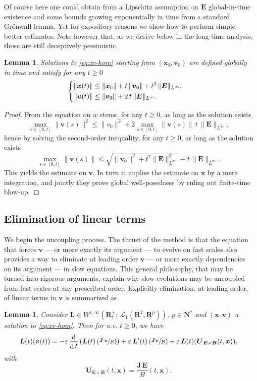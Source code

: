 \documentclass[JEP,XML,SOM,Unicode]{cedram}
\let\mathcal\mathscr
\newenvironment{splitcases}
{\begin{cases}\begin{aligned}}
{\end{aligned}\end{cases}}
\let\eps\varepsilon
\DeclareMathOperator\dD{d}\let\dd\dD
\theoremstyle{plain}
\newtheorem{lemma}[theorem]{Lemma}
\theoremstyle{definition}
\newcommand{\be}{\begin{equation}}
\newcommand{\ee}{\end{equation}}
\newcommand{\bl}{\begin{lemma}}
\newcommand{\el}{\end{lemma}}
\newcommand\R{\mathbf R}
\newcommand{\N}{\mathbf N}
\newcommand\bB{{\boldsymbol B}}
\newcommand\bE{{\boldsymbol E}}
\newcommand\bJ{{\boldsymbol J}}
\newcommand\bL{{\boldsymbol L}}
\newcommand\bU{{\boldsymbol U}}
\newcommand\bfv{{\boldsymbol v}}
\newcommand\bfx{{\boldsymbol x}}
\newcommand\cL{{\mathcal L}}
\let\e w
\newcommand{\EcB}{\bU_{\bE\times\bB}}
\begin{document}
Of course here one could obtain from a Lipschitz assumption on $\bE$ global-in-time existence and some bounds growing exponentially in time from a standard Grönwall lemma. Yet for expository reasons we show how to perform simple better estimates. Note however that, as we derive below in the long-time analysis, those are still deceptively pessimistic.

\bl
\label{toy-bnd0}
Solutions to \eqref{eq:xv-hom} starting from $(\bfx_0,\bfv_0)$ are
defined globally in time and satisfy for any $t\geq0$
\[
\begin{splitcases}
\|\bfx(t)\|&\leq \|\bfx_0\|
+t\,\|\bfv_0\|+t^2\,\|\bE\|_{L^\infty},
\\
\|\bfv(t)\|&\leq
\|\bfv_0\|+2\,t\,\|\bE\|_{L^\infty}.
\end{splitcases}
\]
\el
\begin{proof}
From the equation on $\e$ stems, for any $t\geq0$, as long as the solution exists
\[
\max_{s\in[0,t]}\|\bfv(s)\|^2\leq
\|v_0\|^2+2\max_{s\in[0,t]}\|\bfv(s)\|\,t\,\|\bE\|_{L^\infty},
\]
hence by solving the second-order inequality, for any $t\geq0$, as long as the solution exists
\[
\max_{s\in[0,t]}\|\bfv(s)\|\leq
\sqrt{\|\bfv_0\|^2+t^2\|\bE\|_{L^\infty}^2}+t\,\|\bE\|_{L^\infty}.
\]
This yields the estimate on $\bfv$. In turn it implies the estimate on $\bfx$ by a mere integration, and jointly they prove global well-posedness by ruling out finite-time blow-up.
\end{proof}

\subsection{Elimination of linear terms}

We begin the uncoupling process. The thrust of the method is that the
equation that forces $\bfv$ --- or more exactly its argument --- to
evolve on fast scales also provides a way to eliminate at leading
order $\bfv$ --- or more exactly dependencies on its argument --- in
slow equations. This general philosophy, that may be turned into
rigorous arguments, explain why slow evolutions may be uncoupled from
fast scales at any prescribed order. Explicitly elimination, at leading order, of linear terms in $\bfv$ is summarized as

\bl
\label{toy-1st}
Consider $\bL\in W^{1,\infty}\left(\R^+_t;\,\cL_1(\R^2,\R^p)\right)$, $p\in\N^*$ and $(\bfx,\bfv)$ a solution to \eqref{eq:xv-hom}. Then
for a.e. $t\geq 0$, we have
\be
\label{toy-res:0}
\bL(t)(\bfv(t))=-\eps\,\frac{\dD}{\dD t}\left(\bL(t)\left(\sfrac{\bJ\,\bfv}{B}\right)\right)
+\eps \,\bL'(t)\left(\sfrac{\bJ\bfv}{B}\right)
+\eps \,\bL(t)(\EcB(t,\bfx)),
\ee
with
\[
\EcB(t,\bfx)=\frac{\bJ \,\bE}{B}(t,\bfx).
\]
\el
\end{document}
